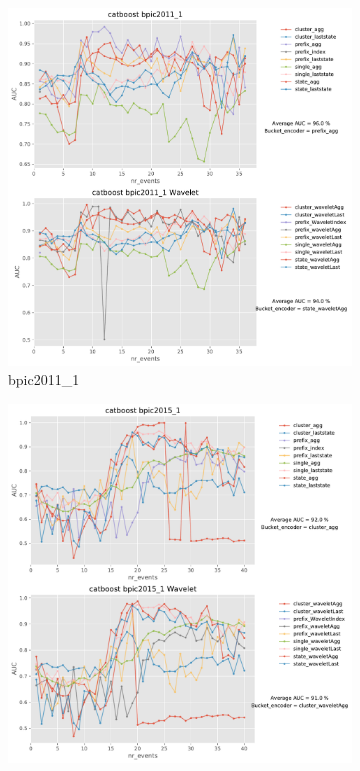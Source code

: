 \documentclass[twoside,11pt]{Latex/Classes/PhDthesisPSnPDF}
\begin{document}



\clearpage




\begin{figure}[!htbp] %

	\begin{subfigure}{0.48\textwidth}
		\includegraphics[width=\linewidth]{images/wavelet/graphs2cat/bpic2011_1.pdf}
		\caption{bpic2011\_1} 
	\end{subfigure}\hspace*{\fill}
	\begin{subfigure}{0.48\textwidth}
		\includegraphics[width=\linewidth]{images/wavelet/graphs2cat/bpic2015_1.pdf}

\end{subfigure}
\end{figure}
\end{document}
